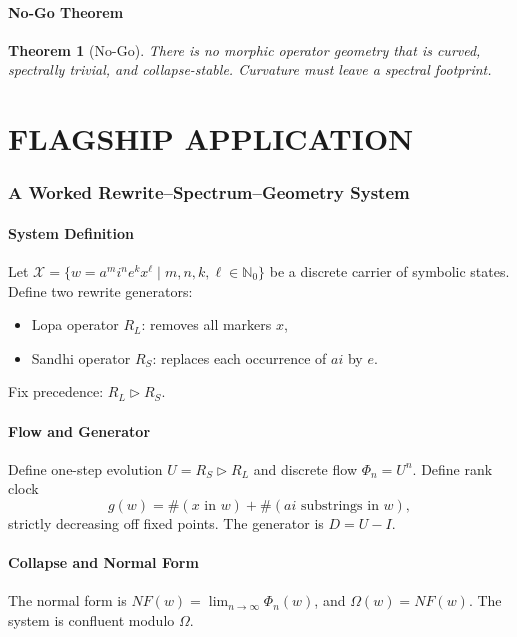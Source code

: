 \documentclass[12pt, oneside]{article}
\newtheorem{theorem}{Theorem}[section]
\begin{document}
\subsection{No-Go Theorem}

\begin{theorem}[No-Go]
There is no morphic operator geometry that is curved, spectrally trivial, and collapse-stable. Curvature must leave a spectral footprint.
\end{theorem}

\part{FLAGSHIP APPLICATION}

\section{A Worked Rewrite–Spectrum–Geometry System}

\subsection{System Definition}

Let $\mathcal{X} = \{ w = a^m i^n e^k x^\ell \mid m,n,k,\ell \in \mathbb{N}_0 \}$ be a discrete carrier of symbolic states. Define two rewrite generators:
\begin{itemize}
    \item Lopa operator $R_L$: removes all markers $x$,
    \item Sandhi operator $R_S$: replaces each occurrence of $ai$ by $e$.
\end{itemize}
Fix precedence: $R_L \triangleright R_S$.

\subsection{Flow and Generator}

Define one-step evolution $U = R_S \triangleright R_L$ and discrete flow $\Phi_n = U^n$. Define rank clock
\[
g(w) = \#(x \text{ in } w) + \#(ai \text{ substrings in } w),
\]
strictly decreasing off fixed points. The generator is $D = U - I$.

\subsection{Collapse and Normal Form}

The normal form is $NF(w) = \lim_{n\to\infty} \Phi_n(w)$, and $\Omega(w) = NF(w)$. The system is confluent modulo $\Omega$.
\end{document}

